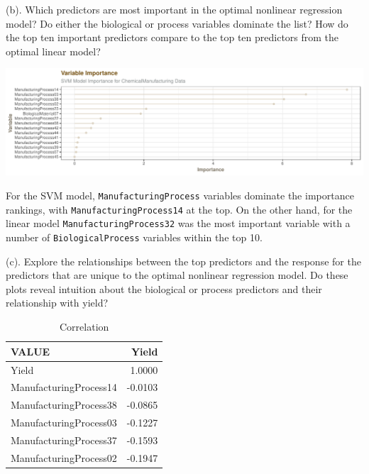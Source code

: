 \documentclass[]{report}
\begin{document}
\begin{subquestion}{(b).}
Which predictors are most important in the optimal nonlinear regression model? Do either the biological or process variables dominate the list? How do the top ten important predictors compare to the top ten predictors from the optimal linear model? 
\end{subquestion}

\includegraphics{AppliedPredictiveModeling_treebased_regression_files/figure-latex/kj-7.5b-1.pdf}

For the SVM model, \texttt{ManufacturingProcess} variables dominate the
importance rankings, with \texttt{ManufacturingProcess14} at the top. On
the other hand, for the linear model \texttt{ManufacturingProcess32} was
the most important variable with a number of \texttt{BiologicalProcess}
variables within the top 10.

\begin{subquestion}{(c).}
Explore the relationships between the top predictors and the response for the predictors that are unique to the optimal nonlinear regression model. Do these plots reveal intuition about the biological or process predictors and their relationship with yield?
\end{subquestion}

\begin{table}[H]

\caption{\label{tab:unnamed-chunk-1}Correlation}
\centering
\fontsize{8}{10}\selectfont
\begin{tabular}[t]{l|r}
\hline
VALUE & Yield\\
\hline
\rowcolor{gray!6}  Yield & 1.0000\\
\hline
ManufacturingProcess14 & -0.0103\\
\hline
\rowcolor{gray!6}  ManufacturingProcess38 & -0.0865\\
\hline
ManufacturingProcess03 & -0.1227\\
\hline
\rowcolor{gray!6}  ManufacturingProcess37 & -0.1593\\
\hline
ManufacturingProcess02 & -0.1947\\
\hline
\end{tabular}
\end{table}
\end{document}
